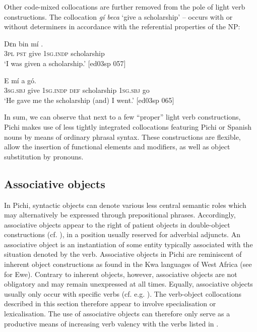 Other code-mixed collocations are further removed from the pole of light verb constructions. The collocation \textit{gí beca} ‘give a scholarship’ – occurs with or without determiners in accordance with the referential properties of the \textsc{NP}: 


\ea%
    \label{ex:key:1170}
    \gll Dɛn  bin    mí    .\\
\textsc{3pl}  \textsc{pst}  give  \textsc{1sg.indp}  scholarship\\

\glt ‘I was given a scholarship.’ [ed03sp 057]
\z


\ea%
    \label{ex:key:1171}
    \gll E      mí            a    gó.\\
\textsc{3sg.sbj}  give  \textsc{1sg.indp}  \textsc{def}  scholarship  \textsc{1sg.sbj}  go\\

\glt ‘He gave me the scholarship (and) I went.’ [ed03sp 065]
\z

In sum, we can observe that next to a few “proper” light verb constructions, Pichi makes use of less tightly integrated collocations featuring Pichi or Spanish nouns by means of ordinary phrasal syntax. These constructions are flexible, allow the insertion of functional elements and modifiers, as well as object substitution by pronouns.

\subsection{Associative objects}\label{sec:9.3.2}

In Pichi, syntactic objects can denote various less central semantic roles which may alternatively be expressed through prepositional phrases. Accordingly, associative objects appear to the right of patient objects in double-object constructions (cf. ), in a position usually reserved for adverbial adjuncts. An associative object is an instantiation of some entity typically associated with the situation denoted by the verb. Associative objects in Pichi are reminiscent of inherent object constructions as found in the Kwa languages of West Africa (see \citealt{Essegbey1999} for Ewe). Contrary to inherent objects, however, associative objects are not obligatory and may remain unexpressed at all times. Equally, associative objects usually only occur with specific verbs (cf. e.g. ). The verb-object collocations described in this section therefore appear to involve specialisation or lexicalisation. The use of associative objects can therefore only serve as a productive means of increasing verb valency with the verbs listed in . 


